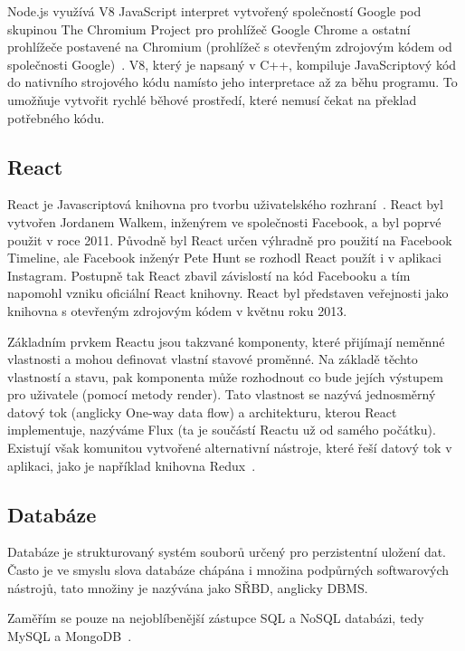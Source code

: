 Node.js využívá V8 JavaScript interpret vytvořený společností Google pod skupinou The Chromium Project pro prohlížeč Google Chrome a ostatní prohlížeče postavené na Chromium (prohlížeč s otevřeným zdrojovým kódem od společnosti Google)~\cite{node:es6}.
V8, který je napsaný v C++, kompiluje JavaScriptový kód do nativního strojového kódu namísto jeho interpretace až za běhu programu.
To umožňuje vytvořit rychlé běhové prostředí, které nemusí čekat na překlad potřebného kódu.~\cite{node:article2013}

\subsection{React}\label{subsec:reactjs}

React je Javascriptová knihovna pro tvorbu uživatelského rozhraní~\cite{react:about}.
React byl vytvořen Jordanem Walkem, inženýrem ve společnosti Facebook, a byl poprvé použit v roce 2011.
Původně byl React určen výhradně pro použití na Facebook Timeline, ale Facebook inženýr Pete Hunt se rozhodl React použít i v aplikaci Instagram.
Postupně tak React zbavil závislostí na kód Facebooku a tím napomohl vzniku oficiální React knihovny.
React byl představen veřejnosti jako knihovna s otevřeným zdrojovým kódem v květnu roku 2013.~\cite{react:author}

Základním prvkem Reactu jsou takzvané komponenty, které přijímají neměnné vlastnosti a mohou definovat vlastní stavové proměnné.
Na základě těchto vlastností a stavu, pak komponenta může rozhodnout co bude jejích výstupem pro uživatele (pomocí metody render).
Tato vlastnost se nazývá jednosměrný datový tok (anglicky One-way data flow) a architekturu, kterou React implementuje, nazýváme Flux (ta je součástí Reactu už od samého počátku).~\cite{react:about}
Existují však komunitou vytvořené alternativní nástroje, které řeší datový tok v aplikaci, jako je například knihovna Redux~\cite{react:redux}.

\subsection{Databáze}\label{subsec:databáze}
Databáze je strukturovaný systém souborů určený pro perzistentní uložení dat.
Často je ve smyslu slova databáze chápána i množina podpůrných softwarových nástrojů, tato množiny je nazývána jako \gls{SŘBD}, anglicky \gls{DBMS}.

Zaměřím se pouze na nejoblíbenější zástupce \gls{SQL} a \gls{NoSQL} databázi, tedy MySQL a MongoDB~\cite{mongo:popularity}.


